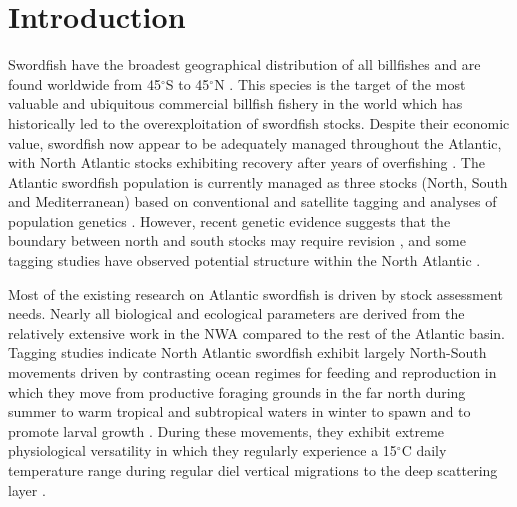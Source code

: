 \section{Introduction}%

Swordfish have the broadest geographical distribution of all billfishes \citep{Braun2015} and are found worldwide from 45$^{\circ}$S to 45$^{\circ}$N \citep{Palko1981}. This species is the target of the most valuable and ubiquitous commercial billfish fishery in the world \citep{FAO2012} which has historically led to the overexploitation of swordfish stocks. Despite their economic value, swordfish now appear to be adequately managed throughout the Atlantic, with North Atlantic stocks exhibiting recovery after years of overfishing \citep{Neilson2013, Collette2011}. The Atlantic swordfish population is currently managed as three stocks (North, South and Mediterranean) based on conventional \citep{Garcia-Cortes2003} and satellite \citep{Neilson2009, Abascal2015} tagging and analyses of population genetics \citep{Bremer1996, AlvaradoBremer2005a, Smith2015}. However, recent genetic evidence suggests that the boundary between north and south stocks may require revision \citep{Smith2015}, and some tagging studies have observed potential structure within the North Atlantic \citep{Neilson2009, Abascal2015}.

Most of the existing research on Atlantic swordfish is driven by stock assessment needs. Nearly all biological and ecological parameters are derived from the relatively extensive work in the NWA compared to the rest of the Atlantic basin. Tagging studies indicate North Atlantic swordfish exhibit largely North-South movements driven by contrasting ocean regimes for feeding and reproduction \citep{Sedberry2001, Neilson2009, Abascal2015} in which they move from productive foraging grounds in the far north during summer to warm tropical and subtropical waters in winter to spawn and to promote larval growth \citep{Arocha1995}. During these movements, they exhibit extreme physiological versatility in which they regularly experience a 15$^{\circ}$C daily temperature range \citep{Abascal2015} during regular diel vertical migrations \citep{Carey1981, Lerner2013} to the deep scattering layer \citep{Carey1990a, Josse1998}. 

